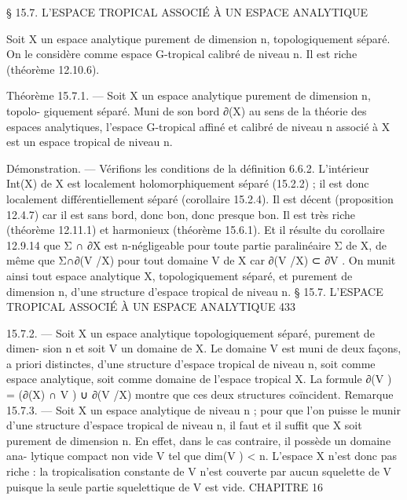 \documentclass[
  10pt,
]{article}
\newenvironment{Shaded}{}{}
\newcommand{\NormalTok}[1]{#1}
\begin{document}
\begin{Shaded}
\begin{Highlighting}[]
\NormalTok{§ 15.7. L’ESPACE TROPICAL ASSOCIÉ À UN ESPACE ANALYTIQUE}

\NormalTok{  Soit X un espace analytique purement de dimension n, topologiquement séparé. On le}
\NormalTok{considère comme espace G{-}tropical calibré de niveau n. Il est riche (théorème 12.10.6).}

\NormalTok{Théorème 15.7.1. — Soit X un espace analytique purement de dimension n, topolo{-}}
\NormalTok{giquement séparé. Muni de son bord ∂(X) au sens de la théorie des espaces analytiques,}
\NormalTok{l’espace G{-}tropical affiné et calibré de niveau n associé à X est un espace tropical de}
\NormalTok{niveau n.}

\NormalTok{Démonstration. — Vérifions les conditions de la définition 6.6.2.}
\NormalTok{  L’intérieur Int(X) de X est localement holomorphiquement séparé (15.2.2) ; il est donc}
\NormalTok{localement différentiellement séparé (corollaire 15.2.4). Il est décent (proposition 12.4.7)}
\NormalTok{car il est sans bord, donc bon, donc presque bon. Il est très riche (théorème 12.11.1) et}
\NormalTok{harmonieux (théorème 15.6.1).}
\NormalTok{  Et il résulte du corollaire 12.9.14 que Σ ∩ ∂X est n{-}négligeable pour toute partie}
\NormalTok{paralinéaire Σ de X, de même que Σ∩∂(V /X) pour tout domaine V de X car ∂(V /X) ⊂}
\NormalTok{∂V .}
\NormalTok{  On munit ainsi tout espace analytique X, topologiquement séparé, et purement de}
\NormalTok{dimension n, d’une structure d’espace tropical de niveau n.}
\NormalTok{              § 15.7. L’ESPACE TROPICAL ASSOCIÉ À UN ESPACE ANALYTIQUE              433}

\NormalTok{15.7.2. — Soit X un espace analytique topologiquement séparé, purement de dimen{-}}
\NormalTok{sion n et soit V un domaine de X. Le domaine V est muni de deux façons, a priori}
\NormalTok{distinctes, d’une structure d’espace tropical de niveau n, soit comme espace analytique,}
\NormalTok{soit comme domaine de l’espace tropical X. La formule ∂(V ) = (∂(X) ∩ V ) ∪ ∂(V /X)}
\NormalTok{montre que ces deux structures coïncident.}
\NormalTok{Remarque 15.7.3. — Soit X un espace analytique de niveau n ; pour que l’on puisse}
\NormalTok{le munir d’une structure d’espace tropical de niveau n, il faut et il suffit que X soit}
\NormalTok{purement de dimension n. En effet, dans le cas contraire, il possède un domaine ana{-}}
\NormalTok{lytique compact non vide V tel que dim(V ) \textless{} n. L’espace X n’est donc pas riche : la}
\NormalTok{tropicalisation constante de V n’est couverte par aucun squelette de V puisque la seule}
\NormalTok{partie squelettique de V est vide.}
\NormalTok{CHAPITRE 16}



\end{Highlighting}
\end{Shaded}
\end{document}
